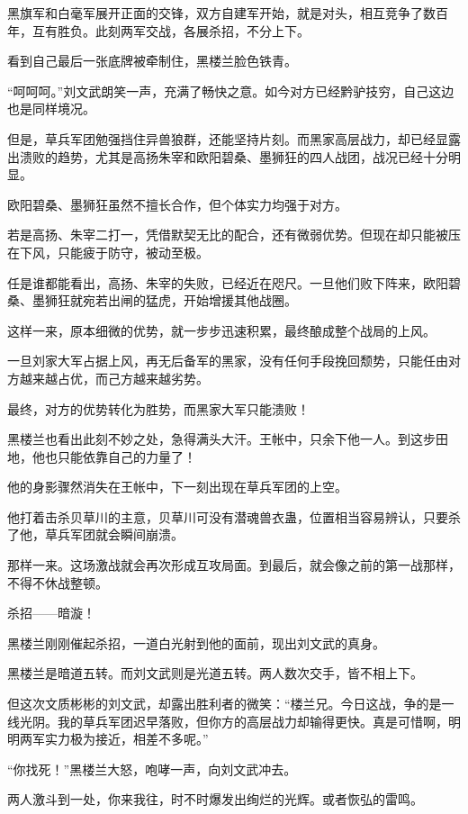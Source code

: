 
\begin{this_body}

黑旗军和白毫军展开正面的交锋，双方自建军开始，就是对头，相互竞争了数百年，互有胜负。此刻两军交战，各展杀招，不分上下。

看到自己最后一张底牌被牵制住，黑楼兰脸色铁青。

“呵呵呵。”刘文武朗笑一声，充满了畅快之意。如今对方已经黔驴技穷，自己这边也是同样境况。

但是，草兵军团勉强挡住异兽狼群，还能坚持片刻。而黑家高层战力，却已经显露出溃败的趋势，尤其是高扬朱宰和欧阳碧桑、墨狮狂的四人战团，战况已经十分明显。

欧阳碧桑、墨狮狂虽然不擅长合作，但个体实力均强于对方。

若是高扬、朱宰二打一，凭借默契无比的配合，还有微弱优势。但现在却只能被压在下风，只能疲于防守，被动至极。

任是谁都能看出，高扬、朱宰的失败，已经近在咫尺。一旦他们败下阵来，欧阳碧桑、墨狮狂就宛若出闸的猛虎，开始增援其他战圈。

这样一来，原本细微的优势，就一步步迅速积累，最终酿成整个战局的上风。

一旦刘家大军占据上风，再无后备军的黑家，没有任何手段挽回颓势，只能任由对方越来越占优，而己方越来越劣势。

最终，对方的优势转化为胜势，而黑家大军只能溃败！

黑楼兰也看出此刻不妙之处，急得满头大汗。王帐中，只余下他一人。到这步田地，他也只能依靠自己的力量了！

他的身影骤然消失在王帐中，下一刻出现在草兵军团的上空。

他打着击杀贝草川的主意，贝草川可没有潜魂兽衣蛊，位置相当容易辨认，只要杀了他，草兵军团就会瞬间崩溃。

那样一来。这场激战就会再次形成互攻局面。到最后，就会像之前的第一战那样，不得不休战整顿。

杀招——暗漩！

黑楼兰刚刚催起杀招，一道白光射到他的面前，现出刘文武的真身。

黑楼兰是暗道五转。而刘文武则是光道五转。两人数次交手，皆不相上下。

但这次文质彬彬的刘文武，却露出胜利者的微笑：“楼兰兄。今日这战，争的是一线光阴。我的草兵军团迟早落败，但你方的高层战力却输得更快。真是可惜啊，明明两军实力极为接近，相差不多呢。”

“你找死！”黑楼兰大怒，咆哮一声，向刘文武冲去。

两人激斗到一处，你来我往，时不时爆发出绚烂的光辉。或者恢弘的雷鸣。


\end{this_body}
